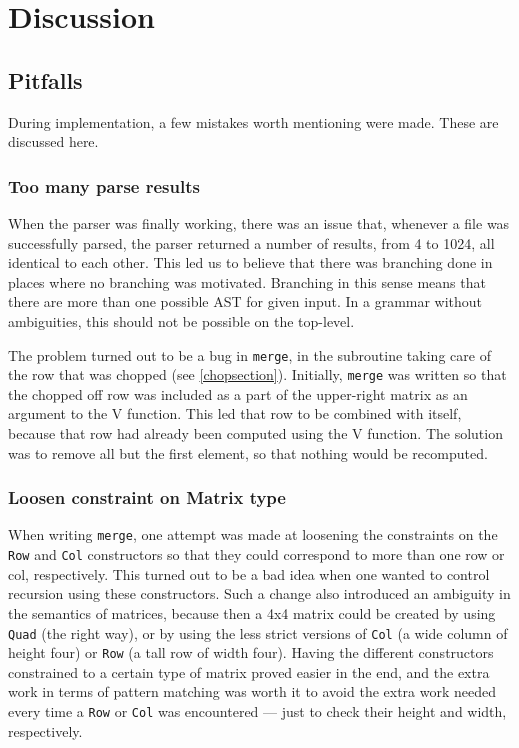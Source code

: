 \documentclass[a4paper,12pt,twosided]{report}
\begin{document}
%
%
\chapter{Discussion}

\section{Pitfalls}
During implementation, a few mistakes worth mentioning were made. These
are discussed here. 

\subsection{Too many parse results}
When the parser was finally working, there was an issue that, whenever a file
was successfully parsed, the parser returned a number of results, from 4 to
1024, all identical to each other. This led us to believe that there was
branching done in places where no branching was motivated. Branching in this
sense means that there are more than one possible AST for given input. In a
grammar without ambiguities, this should not be possible on the top-level.

The problem turned out to be a bug in \texttt{merge}, in the subroutine taking
care of the row that was chopped (see \ref{chopsection}). Initially,
\texttt{merge} was written so that the chopped off row was included as a part of
the upper-right matrix as an argument to the V function. This led that row to be
combined with itself, because that row had already been computed using the V
function. The solution was to remove all but the first element, so that nothing
would be recomputed.

\subsection{Loosen constraint on Matrix type}
When writing \texttt{merge}, one attempt was made at loosening the constraints
on the \texttt{Row} and \texttt{Col} constructors so that they could correspond
to more than one row or col, respectively. This turned out to be a bad idea when
one wanted to control recursion using these constructors. Such a change also
introduced an ambiguity in the semantics of matrices, because then a 4x4 matrix
could be created by using \texttt{Quad} (the right way), or by using the less
strict versions of \texttt{Col} (a wide column of height four) or \texttt{Row}
(a tall row of width four). Having the different constructors constrained to a
certain type of matrix proved easier in the end, and the extra work in terms of
pattern matching was worth it to avoid the extra work needed every time a
\texttt{Row} or \texttt{Col} was encountered --- just to check their height and
width, respectively.  
\end{document}
